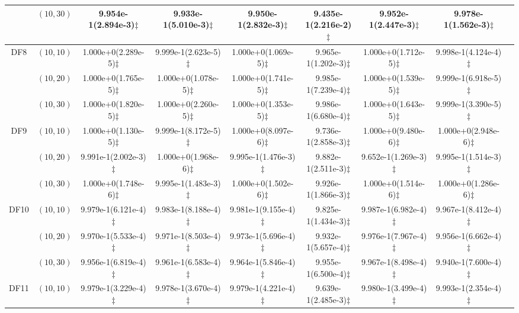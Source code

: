 \documentclass[review]{elsarticle}
\begin{document}
\begin{table*}[!tbh]
{{\begin{tabular} {ccccccccc}
&$(10,30)$ &9.954e-1(2.894e-3)$\ddagger$ &9.933e-1(5.010e-3)$\ddagger$ &9.950e-1(2.832e-3)$\ddagger$ &9.435e-1(2.216e-2)$\ddagger$ &9.952e-1(2.447e-3)$\ddagger$ &9.978e-1(1.562e-3)$\ddagger$ \\
\hline  \multirow{3}{*}{DF8}
&$(10,10)$ &1.000e+0(2.289e-5)$\ddagger$ &9.999e-1(2.623e-5)$\ddagger$ &1.000e+0(1.069e-5)$\ddagger$ &9.965e-1(1.202e-3)$\ddagger$ &1.000e+0(1.712e-5)$\ddagger$ &9.998e-1(4.124e-4)$\ddagger$ \\
&$(10,20)$ &1.000e+0(1.765e-5)$\ddagger$ &1.000e+0(1.078e-5)$\ddagger$ &1.000e+0(1.741e-5)$\ddagger$ &9.985e-1(7.239e-4)$\ddagger$ &1.000e+0(1.539e-5)$\ddagger$ &9.999e-1(6.918e-5)$\ddagger$ \\
&$(10,30)$ &1.000e+0(1.820e-5)$\ddagger$ &1.000e+0(2.260e-5)$\ddagger$ &1.000e+0(1.353e-5)$\ddagger$ &9.986e-1(6.680e-4)$\ddagger$ &1.000e+0(1.643e-5)$\ddagger$ &9.999e-1(3.390e-5)$\ddagger$ \\
\hline  \multirow{3}{*}{DF9}
&$(10,10)$ &1.000e+0(1.130e-5)$\ddagger$ &9.999e-1(8.172e-5)$\ddagger$ &1.000e+0(8.097e-6)$\ddagger$ &9.736e-1(2.858e-3)$\ddagger$ &1.000e+0(9.480e-6)$\ddagger$ &1.000e+0(2.948e-6)$\ddagger$ \\
&$(10,20)$ &9.991e-1(2.002e-3)$\ddagger$ &1.000e+0(1.968e-6)$\ddagger$ &9.995e-1(1.476e-3)$\ddagger$ &9.882e-1(2.511e-3)$\ddagger$ &9.652e-1(1.269e-3)$\ddagger$ &9.995e-1(1.514e-3)$\ddagger$ \\
&$(10,30)$ &1.000e+0(1.748e-6)$\ddagger$ &9.995e-1(1.483e-3)$\ddagger$ &1.000e+0(1.502e-6)$\ddagger$ &9.926e-1(1.866e-3)$\ddagger$ &1.000e+0(1.514e-6)$\ddagger$ &1.000e+0(1.286e-6)$\ddagger$ \\
\hline  \multirow{3}{*}{DF10}
&$(10,10)$ &9.979e-1(6.121e-4)$\ddagger$ &9.983e-1(8.188e-4)$\ddagger$ &9.981e-1(9.155e-4)$\ddagger$ &9.825e-1(1.434e-3)$\ddagger$ &9.987e-1(6.982e-4)$\ddagger$ &9.967e-1(8.412e-4)$\ddagger$ \\
&$(10,20)$ &9.970e-1(5.533e-4)$\ddagger$ &9.971e-1(8.503e-4)$\ddagger$ &9.973e-1(5.696e-4)$\ddagger$ &9.932e-1(5.657e-4)$\ddagger$ &9.976e-1(7.967e-4)$\ddagger$ &9.956e-1(6.662e-4)$\ddagger$ \\
&$(10,30)$ &9.956e-1(6.819e-4)$\ddagger$ &9.961e-1(6.583e-4)$\ddagger$ &9.964e-1(5.846e-4)$\ddagger$ &9.955e-1(6.500e-4)$\ddagger$ &9.967e-1(8.498e-4)$\ddagger$ &9.940e-1(7.600e-4)$\ddagger$ \\
\hline  \multirow{3}{*}{DF11}
&$(10,10)$ &9.979e-1(3.229e-4)$\ddagger$ &9.978e-1(3.670e-4)$\ddagger$ &9.979e-1(4.221e-4)$\ddagger$ &9.639e-1(2.485e-3)$\ddagger$ &9.980e-1(3.499e-4)$\ddagger$ &9.993e-1(2.354e-4)$\ddagger$ \\

\end{tabular}}}
\end{table*}
\end{document}
